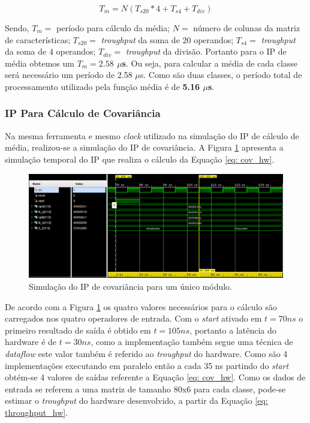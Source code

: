 \begin{equation}
\label{eq: throughput}
	T_m = N(T_{s20}*4 + T_{s4} + T_{div})  
\end{equation}

Sendo, $T_m =$ período para cálculo da média; $N =$ número de colunas da matriz de características; $T_{s20} =$ \textit{troughput} da soma de 20 operandos; $T_{s4} =$ \textit{troughput} da soma de 4 operandos; $T_{div} =$ \textit{troughput} da divisão. Portanto para o IP de média obtemos um \textbf{$T_m = 2.58$ $\mu$s}. Ou seja, para calcular a média de cada classe será necessário um período de 2.58 $\mu$s. Como são duas classes, o período total de processamento utilizado pela função média é de \textbf{5.16 $\mu$s}.

\subsubsection{IP Para Cálculo de Covariância}

Na mesma ferramenta e mesmo \textit{clock} utilizado na simulação do IP de cálculo de média, realizou-se a simulação do IP de covariância. A Figura \ref{simulacao_cov} apresenta a simulação temporal do IP que realiza o cálculo da Equação \ref{eq: cov_hw}.


\begin{figure}[!h]
	\centering
	\includegraphics[keepaspectratio=true,scale=0.5]{figuras/Simulacao_cov.PNG}
	\caption{Simulação do IP de covariância para um único módulo.}
	\label{simulacao_cov}
\end{figure}

De acordo com a Figura \ref{simulacao_cov} os quatro valores necessários para o cálculo são carregados nos quatro operadores de entrada. Com o \textit{start} ativado em $t = 70 ns$ o primeiro resultado de saída é obtido em $t = 105 ns$, portanto a latência do hardware é de $t = 30 ns$, como a implementação também segue uma técnica de \textit{dataflow} este valor também é referido ao \textit{troughput} do hardware. Como são 4 implementações executando em paralelo então a cada 35 ns partindo do \textit{start} obtém-se 4 valores de saídas referente a Equação \ref{eq: cov_hw}. Como os dados de entrada se referem a uma matriz de tamanho 80x6 para cada classe, pode-se estimar o \textit{troughput} do hardware desenvolvido, a partir da Equação \ref{eq: throughput_hw}.

